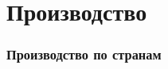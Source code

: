 \section{Производство}

\begin{frame}
    \frametitle{Производство по странам}
    \begin{center}
    
    \end{center}
\end{frame}